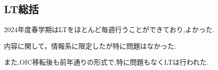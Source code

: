 \subsection*{LT総括}


2024年度春学期はLTをほとんど毎週行うことができており,よかった.

内容に関して，情報系に限定したが特に問題はなかった.

また,OIC移転後も前年通りの形式で,特に問題もなくLTは行われた.